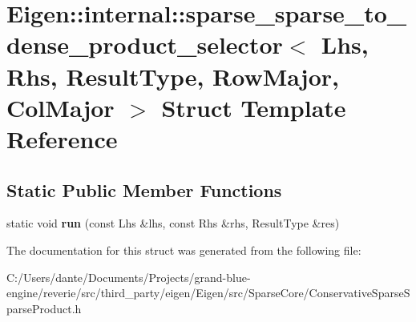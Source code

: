 \hypertarget{struct_eigen_1_1internal_1_1sparse__sparse__to__dense__product__selector_3_01_lhs_00_01_rhs_00_08b233438bc6784cbf4bc720db2f0656b}{}\section{Eigen\+::internal\+::sparse\+\_\+sparse\+\_\+to\+\_\+dense\+\_\+product\+\_\+selector$<$ Lhs, Rhs, Result\+Type, Row\+Major, Col\+Major $>$ Struct Template Reference}
\label{struct_eigen_1_1internal_1_1sparse__sparse__to__dense__product__selector_3_01_lhs_00_01_rhs_00_08b233438bc6784cbf4bc720db2f0656b}
\subsection*{Static Public Member Functions}
\begin{DoxyCompactItemize}
\item 
\mbox{\label{struct_eigen_1_1internal_1_1sparse__sparse__to__dense__product__selector_3_01_lhs_00_01_rhs_00_08b233438bc6784cbf4bc720db2f0656b_a6252b4f2d638d1b6da25b1681147d145}} 
static void {\bfseries run} (const Lhs \&lhs, const Rhs \&rhs, Result\+Type \&res)
\end{DoxyCompactItemize}


The documentation for this struct was generated from the following file\+:\begin{DoxyCompactItemize}
\item 
C\+:/\+Users/dante/\+Documents/\+Projects/grand-\/blue-\/engine/reverie/src/third\+\_\+party/eigen/\+Eigen/src/\+Sparse\+Core/Conservative\+Sparse\+Sparse\+Product.\+h\end{DoxyCompactItemize}
